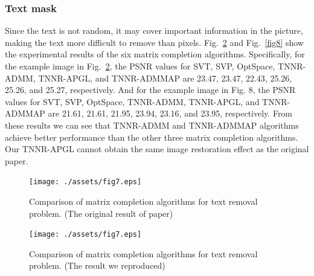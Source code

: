 \documentclass{article}
\begin{document}
{\subsubsection{Text mask}
\label{text}

Since the text is not random, it may cover important information in the picture, making the text more difficult to remove than pixels. Fig.~\ref{fig7} and Fig.~\ref{fig8} show the experimental results of the six matrix
completion algorithms. Specifically, for the example image
in Fig.~\ref{fig7}, the PSNR values for SVT, SVP, OptSpace, TNNR-
ADMM, TNNR-APGL, and TNNR-ADMMAP are 23.47,
23.47, 22.43, 25.26, 25.26, and 25.27, respectively. And for the
example image in Fig. 8, the PSNR values for SVT, SVP,
OptSpace, TNNR-ADMM, TNNR-APGL, and TNNR-ADMMAP are 21.61, 21.61, 21.95, 23.94, 23.16, and 23.95, respectively. 
From these results we can see that TNNR-ADMM and TNNR-ADMMAP algorithms achieve better performance than the other three matrix completion algorithms. Our TNNR-APGL cannot obtain the same image restoration effect as the original paper.

\begin{figure}[ht]
    \centering
    \texttt{[image: ./assets/fig7.eps]}
    \caption{Comparison of matrix completion algorithms for text removal problem. (The original result of paper)\label{fig7ori}}
\end{figure}
\begin{figure}[ht]
    \centering
    \texttt{[image: ./assets/fig7.eps]}
    \caption{Comparison of matrix completion algorithms for text removal problem. (The result we reproduced)\label{fig7}}
\end{figure}

}
\end{document}
